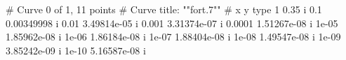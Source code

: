 
# Curve 0 of 1, 11 points
# Curve title: ""fort.7""
# x y type
 1  0.35  i
 0.1  0.00349998  i
 0.01  3.49814e-05  i
 0.001  3.31374e-07  i
 0.0001  1.51267e-08  i
 1e-05  1.85962e-08  i
 1e-06  1.86184e-08  i
 1e-07  1.88404e-08  i
 1e-08  1.49547e-08  i
 1e-09  3.85242e-09  i
 1e-10  5.16587e-08  i

